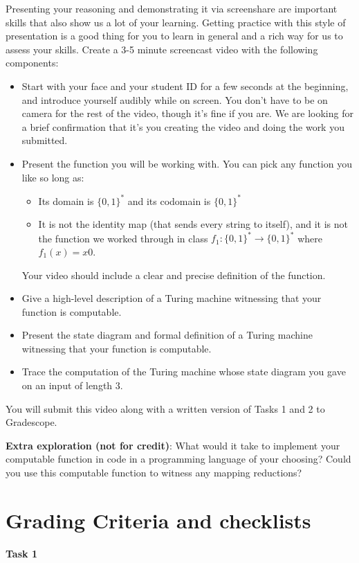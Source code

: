 \documentclass[12pt, oneside]{article}
\begin{document}
 Presenting your reasoning and demonstrating it via screenshare are important skills that 
 also show us a lot of your learning. Getting practice with this style of presentation is a 
 good thing for you to learn in general and a rich way for us to assess your skills. Create 
 a 3-5 minute screencast video with the following components:
 \begin{itemize}
	\item Start with your face and your student ID for a few seconds at the beginning, and introduce yourself audibly while on screen. 
	You don't have to be on camera for the rest of the video, though it's fine if you are. 
	We are looking for a brief confirmation that it's you creating the video and 
	doing the work you submitted.
	\item Present the function you will be working with. You can pick any function you like so long as:
	\begin{itemize}
		\item Its domain is $\{0,1\}^*$ and its codomain is $\{0,1\}^*$
		\item It is not the identity map (that sends every string to itself), and it is not the function we 
		worked through in class $f_1: \{0,1\}^* \to \{0,1\}^*$ where $f_1(x) = x0$.
	\end{itemize}
	Your video should include a clear and precise definition of the function.
	\item Give a high-level description of a Turing machine witnessing that your function is computable.
	\item Present the state diagram and formal definition of a Turing machine witnessing that your function is computable.
	\item Trace the computation of the Turing machine whose state diagram you gave on an input of length $3$.
\end{itemize}
You will submit this video along with a written version of Tasks 1 and 2 to Gradescope.

{\bf Extra exploration (not for credit)}: What would it take to implement your computable function in code in a programming language
of your choosing? Could you use this computable function to witness any mapping reductions?

	
\section{Grading Criteria and checklists}

{\bf Task 1}
\end{document}
